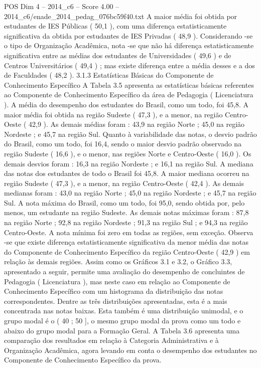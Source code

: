 \begin{textsample}{POS Dim 4 – 2014\_c6 – Score 4.00 – 2014\_c6/enade\_2014\_pedag\_076bc59f40.txt}
A maior média foi obtida por estudantes de IES Públicas ( 50,1 ), com uma diferença estatisticamente significativa da obtida por estudantes de IES Privadas ( 48,9 ).
Considerando -se o tipo de Organização Acadêmica, nota -se que não há diferença estatisticamente significativa entre as médias dos estudantes de Universidades ( 49,6 ) e de Centros Universitários ( 49,4 ) ; mas existe diferença entre a média desses e a dos de Faculdades ( 48,2 ). 3.1.3 Estatísticas Básicas do Componente de Conhecimento Específico A Tabela 3.5 apresenta as estatísticas básicas referentes ao Componente de Conhecimento Específico da área de Pedagogia ( Licenciatura ).
A média do desempenho dos estudantes do Brasil, como um todo, foi 45,8.
A maior média foi obtida na região Sudeste ( 47,3 ), e a menor, na região Centro-Oeste ( 42,9 ).
As demais médias foram : 43,9 na região Norte ; 45,0 na região Nordeste ; e 45,7 na região Sul.
Quanto à variabilidade das notas, o desvio padrão do Brasil, como um todo, foi 16,4, sendo o maior desvio padrão observado na região Sudeste ( 16,6 ), e o menor, nas regiões Norte e Centro-Oeste ( 16,0 ).
Os demais desvios foram : 16,3 na região Nordeste ; e 16,1 na região Sul.
A mediana das notas dos estudantes de todo o Brasil foi 45,8.
A maior mediana ocorreu na região Sudeste ( 47,3 ), e a menor, na região Centro-Oeste ( 42,4 ).
As demais medianas foram : 43,0 na região Norte ; 45,0 na região Nordeste ; e 45,7 na região Sul.
A nota máxima do Brasil, como um todo, foi 95,0, sendo obtida por, pelo menos, um estudante na região Sudeste.
As demais notas máximas foram : 87,8 na região Norte ; 92,8 na região Nordeste ; 91,3 na região Sul ; e 94,3 na região Centro-Oeste.
A nota mínima foi zero em todas as regiões, sem exceção.
Observa -se que existe diferença estatisticamente significativa da menor média das notas do Componente de Conhecimento Específico da região Centro-Oeste ( 42,9 ) em relação às demais regiões.
Assim como os Gráficos 3.1 e 3.2, o Gráfico 3.3, apresentado a seguir, permite uma avaliação do desempenho de concluintes de Pedagogia ( Licenciatura ), mas neste caso em relação ao Componente de Conhecimento Específico com um histograma da distribuição das notas correspondentes.
Dentre as três distribuições apresentadas, esta é a mais concentrada nas notas baixas.
Esta também é uma distribuição unimodal, e o grupo modal é o ( 40 ; 50 ], o mesmo grupo modal da prova como um todo e abaixo do grupo modal para a Formação Geral.
A Tabela 3.6 apresenta uma comparação dos resultados em relação à Categoria Administrativa e à Organização Acadêmica, agora levando em conta o desempenho dos estudantes no Componente de Conhecimento Específico da prova.

\end{textsample}
